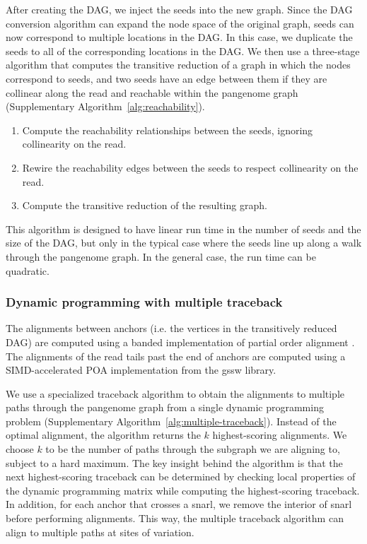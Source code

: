 \documentclass[11pt]{ucthesis}
\begin{document}
After creating the DAG, we inject the seeds into the new graph. Since the DAG conversion algorithm can expand the node space of the original graph, seeds can now correspond to multiple locations in the DAG. In this case, we duplicate the seeds to all of the corresponding locations in the DAG.  We then use a three-stage algorithm that computes the transitive reduction of a graph in which the nodes correspond to seeds, and two seeds have an edge between them if they are collinear along the read and reachable within the pangenome graph (Supplementary Algorithm~\ref{alg:reachability}). 

\begin{enumerate}
    \item Compute the reachability relationships between the seeds, ignoring collinearity on the read.
    \item Rewire the reachability edges between the seeds to respect collinearity on the read.
    \item Compute the transitive reduction of the resulting graph.
\end{enumerate}

This algorithm is designed to have linear run time in the number of seeds and the size of the DAG, but only in the typical case where the seeds line up along a walk through the pangenome graph. In the general case, the run time can be quadratic.

\subsubsection{Dynamic programming with multiple traceback}

The alignments between anchors (i.e. the vertices in the transitively reduced DAG) are computed using a banded implementation of partial order alignment \cite{lee2002multiple}. The alignments of the read tails past the end of anchors are computed using a SIMD-accelerated POA implementation from the gssw library. 
	
We use a specialized traceback algorithm to obtain the alignments to multiple paths through the pangenome graph from a single dynamic programming problem (Supplementary Algorithm~\ref{alg:multiple-traceback}). Instead of the optimal alignment, the algorithm returns the $k$ highest-scoring alignments. We choose $k$ to be the number of paths through the subgraph we are aligning to, subject to a hard maximum. The key insight behind the algorithm is that the next highest-scoring traceback can be determined by checking local properties of the dynamic programming matrix while computing the highest-scoring traceback. In addition, for each anchor that crosses a snarl, we remove the interior of snarl before performing alignments. This way, the multiple traceback algorithm can align to multiple paths at sites of variation.
\end{document}
